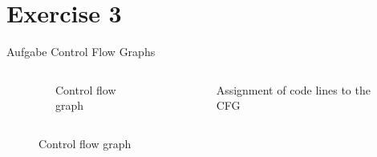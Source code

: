 
\section{Exercise 3}

\setcounter{exercise}{2}

\begin{frame}[allowframebreaks]{Aufgabe \thesection}{Control Flow Graphs}
  \begin{solution}
    \begin{columns}
      \begin{column}[t]{0.3\textwidth}
        \begin{linenums}
        \end{linenums}
      \end{column}
      \begin{column}[t]{0.3\textwidth}
        \begin{figure}
          \caption{Control flow graph}
        \end{figure}
      \end{column}
      \begin{column}[t]{0.3\textwidth}
        \begin{figure}
          \caption{Assignment of code lines to the CFG}
        \end{figure}
      \end{column}
    \end{columns}
  \end{solution}
  \begin{solutionnoinc}
    \begin{columns}
      \begin{column}[t]{0.3\textwidth}
        \begin{figure}
          \caption{Control flow graph}
        \end{figure}
      \end{column}
      \begin{column}[t]{0.7\textwidth}
        \domtreecalc
      \end{column}
    \end{columns}
  \end{solutionnoinc}

\end{frame}
